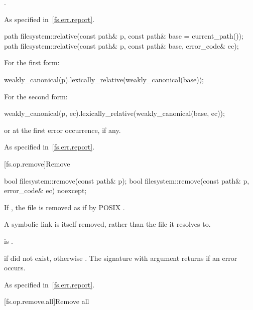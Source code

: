 \begin{itemdescr}
\pnum
\returns
{}.

\pnum
\throws
As specified in~\ref{fs.err.report}.
\end{itemdescr}

%
\begin{itemdecl}
path filesystem::relative(const path& p, const path& base = current_path());
path filesystem::relative(const path& p, const path& base, error_code& ec);
\end{itemdecl}

\begin{itemdescr}
\pnum
\returns
For the first form:
\begin{codeblock}
weakly_canonical(p).lexically_relative(weakly_canonical(base));
\end{codeblock}
  For the second form:
\begin{codeblock}
weakly_canonical(p, ec).lexically_relative(weakly_canonical(base, ec));
\end{codeblock}
  or  at the first error occurrence, if any.

\pnum
\throws
As specified in~\ref{fs.err.report}.
\end{itemdescr}

[fs.op.remove]{Remove}

%
\begin{itemdecl}
bool filesystem::remove(const path& p);
bool filesystem::remove(const path& p, error_code& ec) noexcept;
\end{itemdecl}

\begin{itemdescr}
\pnum
\effects
If , the file  is
  removed as if by POSIX .
\begin{note}
A symbolic link is itself removed, rather than the file it
  resolves to.
\end{note}

\pnum
\ensures
{} is .

\pnum
\returns
{} if  did not exist,
  otherwise . The signature with argument 
  returns  if an error occurs.

\pnum
\throws
As specified in~\ref{fs.err.report}.
\end{itemdescr}


[fs.op.remove.all]{Remove all}

